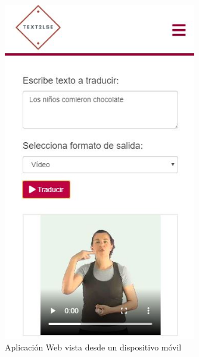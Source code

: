 \begin{figure}[]
	\centering
	\includegraphics[width=0.75\textwidth]{Imagenes/Fuentes/Text2LSE/responsive.jpg}
	\caption{ Aplicación Web vista desde un dispositivo móvil }
	\label {fig: imgResponsive}
\end{figure}



